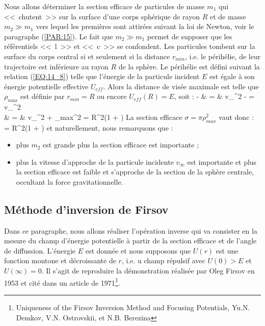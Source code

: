Nous allons d\'eterminer la section efficace de particules de masse $m_{1}$ qui <<~chutent~>> sur la surface d'une corps sph\'erique de rayon $R$ et de masse $m_{2} \gg m_{1}$ vers lequel les premi\`eres sont attir\'ees suivant la loi de Newton, voir le paragraphe (\ref{PAR:15}). Le fait que $m_{2} \gg m_{1}$ permet de supposer que les r\'ef\'erentiels <<~l~>> et <<~c~>> se confondent. Les particules tombent sur la surface du corps central si et seulement si la distance $r_{min}$, i.e. le p\'erih\'elie, de leur trajectoire est inf\'erieure au rayon $R$ de la sph\`ere. Le p\'erih\'elie est d\'efini suivant la relation (\ref{EQ:14_8}) telle que l'\'energie de la particule incident $E$ est \'egale à son \'energie potentielle effective $U_{eff}$. Alors la distance de vis\'ee maximale est telle que $\rho_{max}$ est d\'efinie par $r_{min} = R$ ou encore $U_{eff}(R) = E$, soit :
\bea
	 -  & = & v_{\infty}^{2} \Leftrightarrow {} -  = v_{\infty}^{2} \nonumber \\
	\Leftrightarrow {} & = & v_{\infty}^{2} +  \Leftrightarrow \rho_{max}^{2} = R^{2}\left(1 + \right) \nonumber
\eea
La section efficace $\sigma = \pi\rho_{max}^{2}$ vaut donc :
\benn
	\sigma = \pi R^{2}\left(1 + \right)
\eenn
et naturellement, nous remarquons que :
\begin{itemize}
	\item plus $m_{2}$ est grande plus la section efficace est importante ;
	\item plus la vitesse d'approche de la particule incidente $v_{\infty}$ est importante et plus la section efficace est faible et s'approche de la section de la sph\`ere centrale, occultant la force gravitationnelle.
\end{itemize}

\subsection{M\'ethode d'inversion de Firsov}

Dans ce paragraphe, nous allons r\'ealiser l'op\'eration inverse qui va consister en la mesure du champ d'\'energie potentielle \`a partir de la section efficace et de l'angle de diffussion. L'\'energie $E$ est donn\'ee et nous supposons que $U(r)$ est une fonction montone et d\'ecroissante de $r$, i.e. u champ r\'epulsif avec $U(0) > E$ et $U(\infty) = 0$. Il s'agit de reproduire la d\'emonstration r\'ealis\'ee par Oleg Firsov en 1953 et cit\'e dans un article de 1971\footnote{Uniqueness of the Firsov Inversion Method and Focusing Potentials, Yu.N. Demkov, V.N. Ostrovskii, et N.B. Berezina}.

